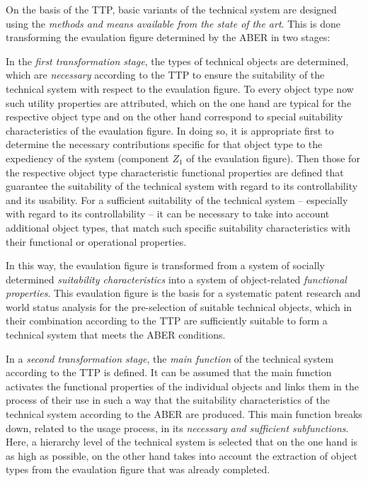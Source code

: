 \documentclass[11pt,a4paper]{article}
\begin{document}
On the basis of the TTP, basic variants of the technical system are designed
using the \emph{methods and means available from the state of the art}.  This
is done transforming the evaulation figure determined by the ABER in two
stages:

In the \emph{first transformation stage}, the types of technical objects are
determined, which are \emph{necessary} according to the TTP to ensure the
suitability of the technical system with respect to the evaulation figure.  To
every object type now such utility properties are attributed, which on the one
hand are typical for the respective object type and on the other hand
correspond to special suitability characteristics of the evaulation figure. In
doing so, it is appropriate first to determine the necessary contributions
specific for that object type to the expediency of the system (component $Z_1$
of the evaulation figure). Then those for the respective object type
characteristic functional properties are defined that guarantee the
suitability of the technical system with regard to its controllability and its
usability. For a sufficient suitability of the technical system -- especially
with regard to its controllability -- it can be necessary to take into account
additional object types, that match such specific suitability characteristics
with their functional or operational properties.

In this way, the evaulation figure is transformed from a system of socially
determined \emph{suitability characteristics} into a system of object-related
\emph{functional properties}. This evaulation figure is the basis for a systematic
patent research and world status analysis for the pre-selection of suitable
technical objects, which in their combination according to the TTP are
sufficiently suitable to form a technical system that meets the ABER
conditions.

In a \emph{second transformation stage}, the \emph{main function} of the
technical system according to the TTP is defined. It can be assumed that the
main function activates the functional properties of the individual objects
and links them in the process of their use in such a way that the suitability
characteristics of the technical system according to the ABER are produced.
This main function breaks down, related to the usage process, in its
\emph{necessary and sufficient subfunctions}. Here, a hierarchy level of the
technical system is selected that on the one hand is as high as possible, on
the other hand takes into account the extraction of object types from the
evaulation figure that was already completed.
\end{document}
